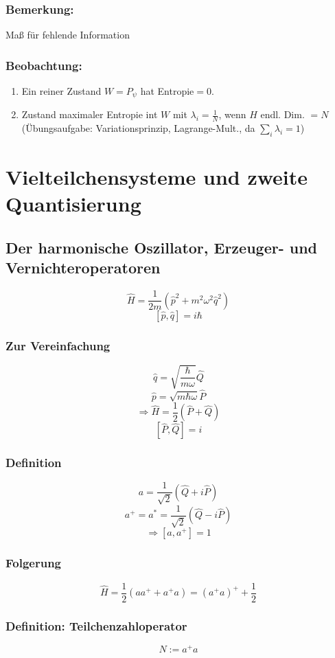 \documentclass[twoside,a4paper]{scrartcl}
\renewcommand{\1}{\mathds{1}}
\newcommand{\Ra}{\Rightarrow}
\renewcommand{\l}{\lambda}
\begin{document}
\subsubsection*{Bemerkung:} 
Maß für fehlende Information
\subsubsection*{Beobachtung:} 
\begin{enumerate}
\item Ein reiner Zustand $W=P_\psi$ hat Entropie$=0$.
\item Zustand maximaler Entropie int $W$ mit $\l_i=\frac{1}{N}$, wenn $H$ endl. Dim. $=N$ (Übungsaufgabe: Variationsprinzip, Lagrange-Mult., da $\sum_i \l_i=1$)
\end{enumerate}

\section{Vielteilchensysteme und zweite Quantisierung} 
\subsection{Der harmonische Oszillator, Erzeuger- und Vernichteroperatoren} 
$$\hat H=\frac{1}{2m}(\hat p^2+m^2\omega^2\hat q^2)$$
$$[\hat p, \hat q]=i\hbar$$
\subsubsection*{Zur Vereinfachung} 
$$\hat q=\sqrt{\frac{\hbar}{m\omega}}\hat Q$$
$$\hat p=\sqrt{m\hbar\omega}\hat P$$
$$\Ra \hat H=\frac{1}{2}(\hat P+ \hat Q)$$
$$[\hat P, \hat Q]=i$$
\subsubsection*{Definition} 
$$a=\frac{1}{\sqrt{2}}(\hat Q+i\hat P)$$
$$a^+=a^*=\frac{1}{\sqrt{2}}(\hat Q-i\hat P)$$
$$\Ra [a,a^+]=1$$
\subsubsection*{Folgerung} 
$$\hat H=\frac{1}{2}(aa^++a^+a)=(a^+a)^++\frac{1}{2}$$
\subsubsection*{Definition: Teilchenzahloperator} 
$$N:=a^+a$$
\end{document}
